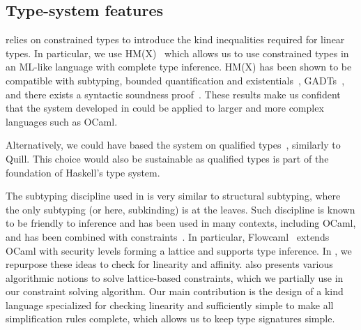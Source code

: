 \subsection{Type-system features}
%
\lang relies on constrained types
to introduce the kind inequalities required for linear types. In
particular, we use HM(X)~\citep{DBLP:journals/tapos/OderskySW99} which
allows us to use constrained types in an ML-like language with complete
type inference.
HM(X) has been shown to be compatible with subtyping,
bounded quantification and existentials~\citep{DBLP:conf/icfp/Simonet03},
GADTs~\citep{DBLP:journals/toplas/SimonetP07},
and there exists a syntactic soundness proof~\citep{DBLP:journals/entcs/SkalkaP02}.
These results make us confident that the system developed in \lang
could be applied to larger and more complex languages such as OCaml.

Alternatively, we could have based the system on qualified
types~\cite{DBLP:journals/scp/Jones94}, similarly to Quill. This
choice would also be sustainable as qualified types is part of the
foundation of Haskell's type system.

The subtyping discipline used in \lang is very similar
to structural subtyping, where the only subtyping (or here, subkinding)
is at the leaves.
Such discipline is known to be friendly to inference and has been used in many
contexts, including OCaml, and has been combined
with constraints~\citep{DBLP:journals/tapos/OderskySW99,DBLP:conf/sas/TrifonovS96}.
In particular, Flowcaml~\citep{DBLP:conf/popl/PottierS02}
extends OCaml with security levels forming a lattice and supports type inference.
In \lang, we repurpose these ideas to check for linearity and affinity.
\citet{DBLP:conf/aplas/Simonet03} also presents various algorithmic
notions to solve lattice-based constraints, which we partially use
in our constraint solving algorithm. Our main contribution
is the design of a kind language specialized for checking linearity
and sufficiently simple to make
all simplification rules complete, which allows us to keep type signatures simple.


